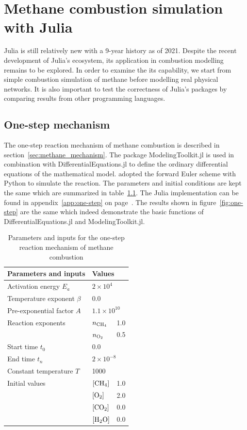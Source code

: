 \chapter{Methane combustion simulation with Julia} \label{ch:methane}

Julia is still relatively new with a 9-year history as of 2021. Despite the recent development of Julia's ecosystem, its application in combustion modelling remains to be explored. In order to examine the its capability, we start from simple combustion simulation of methane before modelling real physical networks. It is also important to test the correctness of Julia's packages by comparing results from other programming languages.

\section{One-step mechanism}

The one-step reaction mechanism of methane combustion is described in section~\ref{sec:methane_mechanism}. The package ModelingToolkit.jl is used in combination with DifferentialEquations.jl to define the ordinary differential equations of the mathematical model. \textcite{methane_python} adopted the forward Euler scheme with Python to simulate the reaction. The parameters and initial conditions are kept the same which are summarized in table~\ref{tab:one-step}. The Julia implementation can be found in appendix~\ref{app:one-step} on page~\pageref{app:one-step}. The results shown in figure~\ref{fig:one-step} are the same which indeed demonstrate the basic functions of DifferentialEquations.jl and ModelingToolkit.jl.

\begin{table}[ht!]
\centering
\begin{tabular}{l l l} 
 \hline
 Parameters and inputs & \multicolumn{2}{l}{Values} \\
 \hline
 Activation energy $E_a$ & \multicolumn{2}{l}{$2 \times 10^4$} \\
 Temperature exponent $\beta$ & \multicolumn{2}{l}{0.0} \\
 Pre-exponential factor $A$ & \multicolumn{2}{l}{$1.1 \times 10^{10}$} \\
 Reaction exponents & $n_{\ce{CH4}}$ & 1.0 \\
 & $n_{\ce{O2}}$ & 0.5 \\
 Start time $t_0$ & \multicolumn{2}{l}{0.0} \\
 End time $t_n$ & \multicolumn{2}{l}{$2 \times 10^{-8}$} \\
 Constant temperature $T$ & \multicolumn{2}{l}{1000} \\
 Initial values & $[\ce{CH4}]$ & 1.0 \\
 & $[\ce{O2}]$ & 2.0 \\
 & $[\ce{CO2}]$ & 0.0 \\
 & $[\ce{H2O}]$ & 0.0 \\
 \hline
\end{tabular}
\caption{Parameters and inputs for the one-step reaction mechanism of methane combustion}
\label{tab:one-step}
\end{table}

